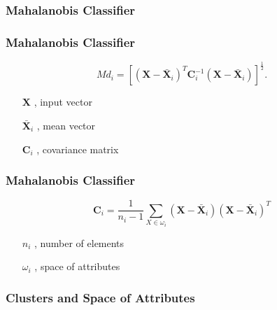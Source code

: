 \documentclass[aspectratio=10]{beamer} %
\begin{document}
\subsubsection{Mahalanobis Classifier}

\begin{frame}
	\frametitle{Mahalanobis Classifier}
	
	\begin{equation}
	Md_{i}=[(\textbf{X}-\bar{\textbf{X}}_{i})^{T}\textbf{C}_{i}^{-1}(\textbf{X}-\bar{\textbf{X}}_{i})]^{\frac{1}{2}}.
	\label{eq5}
	\end{equation}
	 \pause
	\begin{itemize}
		\centering
    	\item[$\textbf{X}$], input vector 
		\pause
		\item[$\bar{\textbf{X}}_{i}$], mean vector
		\pause
		\item[$\textbf{C}_{i}$], covariance matrix
	\end{itemize}
\end{frame}


\begin{frame}
\frametitle{Mahalanobis Classifier}

\begin{equation}
\textbf{C}_{i}=\frac{1}{n_{i}-1}\sum_{X \in \omega_{i}}(\textbf{X}-\bar{\textbf{X}}_{i})(\textbf{X}-\bar{\textbf{X}}_{i})^{T}
\label{eq6}
\end{equation}
\pause
\begin{itemize}
	\centering
	\item[$n_{i}$], number of elements  
	\pause
	\item[$\omega_{i}$], space of attributes
\end{itemize}
\end{frame}

\subsubsection{Clusters and Space of Attributes}
\end{document}
